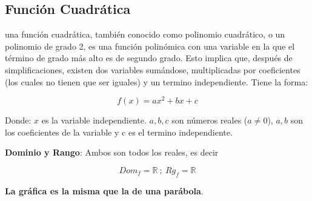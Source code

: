 

\subsection{Función Cuadrática}

    una función cuadrática, también conocido como polinomio cuadrático,
    o un polinomio de grado 2,
    es una función polinómica con una variable en la que el término de
    grado más alto es de segundo grado. Esto implica que, después de simplificaciones,
    existen dos variables sumándose, multiplicadas por coeficientes (los cuales no tienen
    que ser iguales) y un termino independiente. Tiene la forma:

    $$ f(x)= ax^2 +bx+c $$

    Donde:
    $ x $  es la variable independiente.
    $a,b,c$ son números reales ($a\not=0$), $ a,b $  son los coeficientes de la
    variable y c es el termino independiente.

    \textbf{Dominio y Rango}: Ambos son todos los reales, es decir

    $$ Dom_f={\mathbb{R}}\ ;\ Rg_f={\mathbb{R}} $$

    \textbf{La gráfica es la misma que la de una parábola}.

